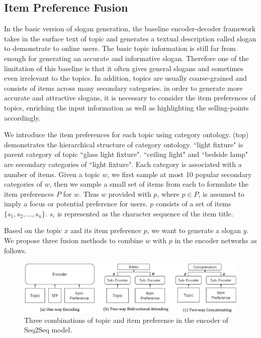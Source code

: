 \subsection{Item Preference Fusion}
\label{sec:preference}
In the basic version of slogan generation,
the baseline encoder-decoder framework takes in 
the surface text of topic and generates a textual description 
called slogan to demonstrate to online users.
The basic topic information is still far from enough
for generating an accurate and informative slogan.
Therefore one of the limitation of this baseline is that
it often gives general slogans and sometimes even irrelevant to the topics.
In addition, topics are usually coarse-grained and consists of items 
across many secondary categories.
in order to generate more accurate and attractive slogans,
it is necessary to consider the item preferences of topics,
enriching the input information as well as 
highlighting the selling-points accordingly.

We introduce the item preferences for each topic using category ontology.
 (top) demonstrates the hierarchical structure of category ontology.
``light fixture" is parent category of  topic ``glass light fixture". 
``ceiling light" and ``bedside lamp"
are secondary categories of ``light fixture".
Each category is associated with a number of items.
Given a topic $w$, we first sample at most 10 popular secondary categories of $w$, then we sample a small set of items from each to formulate the item preferences
$P$ for $w$.
Thus $w$ provided with $p$, where $p \in P$, is assumed to 
imply a focus or potential preference for users.
$p$ consists of a set of items $\{s_1, s_2, ..., s_u\}$.
$s_i$ is represented as the character sequence of the item title.

Based on the topic $x$ and its item preference $p$, we want to generate 
a slogan $y$.
We propose three fusion methods to combine $w$ with $p$ in the encoder networks
as follows.

\begin{figure}[th!]
	\centering
	\includegraphics[width=1.9\columnwidth]{figures/enc}
	\caption{Three combinations of topic and item preference in the encoder of Seq2Seq model.}
	\label{fig:enc}
\end{figure}


